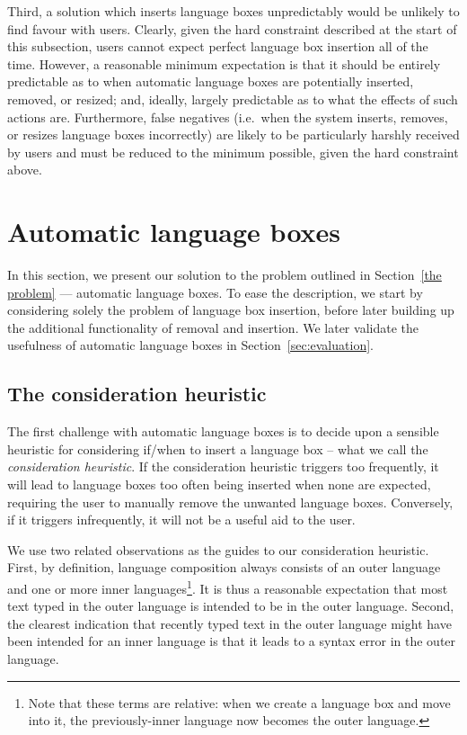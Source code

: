 \documentclass[sigplan,screen]{acmart}\settopmatter{printfolios=true,printccs=false,printacmref=false}
\begin{document}
Third, a solution which inserts language boxes unpredictably would be unlikely
to find favour with users. Clearly, given the hard constraint described at the
start of this subsection, users cannot expect perfect language box insertion
all of the time. However, a reasonable minimum expectation is that it should be
entirely predictable as to when automatic language boxes are potentially
inserted, removed, or
resized; and, ideally, largely predictable as to what the effects of such
actions are. Furthermore, false negatives (i.e.~when the system inserts, removes,
or resizes language boxes incorrectly) are likely to be particularly harshly
received by users and must be reduced to the minimum possible, given the hard
constraint above.


\section{Automatic language boxes}

In this section, we present our solution to the problem outlined in
Section~\ref{the problem} --- automatic language boxes. To ease the
description, we start by considering solely the problem of language box
insertion, before later building up the additional functionality of removal and
insertion. We later validate the usefulness of automatic language boxes in
Section~\ref{sec:evaluation}.


\subsection{The consideration heuristic}

The first challenge with automatic language boxes is to decide upon a sensible
heuristic for considering if/when to insert a language box -- what we call the
\emph{consideration heuristic}. If the consideration heuristic triggers too
frequently, it will lead to language boxes too often being inserted when none
are expected, requiring the user to manually remove the unwanted language
boxes. Conversely, if it triggers infrequently, it will not be a useful aid to the user.

We use two related observations as the guides to our consideration heuristic.
First, by definition, language composition always consists of an outer language
and one or more inner languages\footnote{Note that these terms are relative:
when we create a language box and move into it, the previously-inner language
now becomes the outer language.}. It is thus a reasonable expectation that most
text typed in the outer language is intended to be in the outer language.
Second, the clearest indication that recently typed text in the outer language
might have been intended for an inner language is that it leads to a syntax error
in the outer language.
\end{document}
